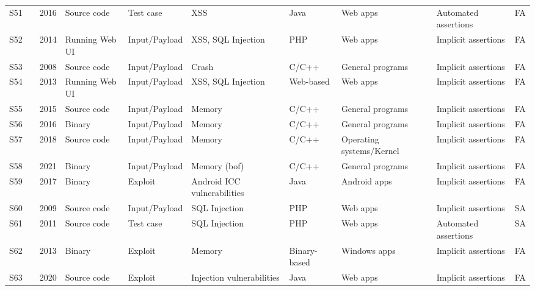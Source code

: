 \begin{table}[t]
{\begin{tabular}{|lp{0.5cm}p{0.5cm}lllllll|}
S51 & \cite{Mohammadi201678}  &  2016  & Source code &   Test case  &   XSS &  Java  &  Web apps  & Automated assertions &   FA   \\
S52 & \cite{aydin2014automated}  &  2014  & Running Web UI &   Input/Payload  &   XSS, SQL Injection &  PHP  &  Web apps  & Implicit assertions &   FA   \\
S53 & \cite{godefroid2008grammar}  &  2008  & Source code &   Input/Payload  &   Crash &  C/C++  & General programs  & Implicit assertions &   FA   \\
S54 & \cite{Huang2013208}  &  2013  & Running Web UI &   Input/Payload  &   XSS, SQL Injection &  Web-based  &  Web apps  & Implicit assertions &   FA   \\
S55 & \cite{Do2015401}  &  2015  & Source code &   Input/Payload  &   Memory &  C/C++  &  General programs  & Implicit assertions &   FA   \\
S56 & \cite{feist2016finding}  &  2016  & Binary &   Input/Payload  &   Memory &  C/C++  &  General programs  & Implicit assertions &   FA   \\
S57 & \cite{wu2018fuze}  &  2018  & Source code &   Input/Payload  &   Memory &  C/C++  &  Operating systems/Kernel  & Implicit assertions &   FA   \\
S58 & \cite{Dixit2021}  &  2021  & Binary &   Input/Payload  &   Memory (bof) &  C/C++  &  General programs  & Implicit assertions &   FA   \\
S59 & \cite{Garcia2017661}  &  2017  & Binary &   Exploit  &   Android ICC vulnerabilities &  Java  &  Android apps  & Implicit assertions  &   FA   \\
S60 & \cite{kieyzun2009automatic}  &  2009  & Source code &  Input/Payload  &   SQL Injection  &  PHP  &  Web apps  &  Implicit assertions  &   SA   \\
S61 & \cite{dao2011security}  &  2011  & Source code &  Test case  &   SQL Injection  &  PHP  &  Web apps  &  Automated assertions  &   SA   \\
S62 & \cite{Wang2013216}  &  2013  & Binary &   Exploit  &  Memory &  Binary-based  &  Windows apps  & Implicit assertions  &   FA   \\
S63 & \cite{Hough2020284}  &  2020  & Source code &   Exploit  &  Injection vulnerabilities &  Java  &  Web apps  & Implicit assertions  &   FA   \\
\bottomrule
\end{tabular}
}
\end{table}